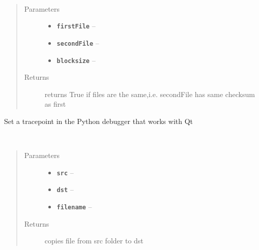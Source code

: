\documentclass[letterpaper,10pt,english]{sphinxmanual}
\begin{document}

\begin{fulllineitems}
\label{library:library.equalsFile}~\begin{quote}\begin{description}
\item[{Parameters}] \leavevmode\begin{itemize}
\item {} 
\textbf{\texttt{firstFile}} -- 

\item {} 
\textbf{\texttt{secondFile}} -- 

\item {} 
\textbf{\texttt{blocksize}} -- 

\end{itemize}

\item[{Returns}] \leavevmode
returns True if files are the same,i.e. secondFile has same checksum as first

\end{description}\end{quote}

\end{fulllineitems}


\begin{fulllineitems}
\label{library:library.pyqt_set_trace}
Set a tracepoint in the Python debugger that works with Qt

\end{fulllineitems}


\begin{fulllineitems}
\label{library:library.copy_changed_kg1_to_save}~\begin{quote}\begin{description}
\item[{Parameters}] \leavevmode\begin{itemize}
\item {} 
\textbf{\texttt{src}} -- 

\item {} 
\textbf{\texttt{dst}} -- 

\item {} 
\textbf{\texttt{filename}} -- 

\end{itemize}

\item[{Returns}] \leavevmode
copies file from src folder to dst

\end{description}\end{quote}

\end{fulllineitems}
\end{document}
